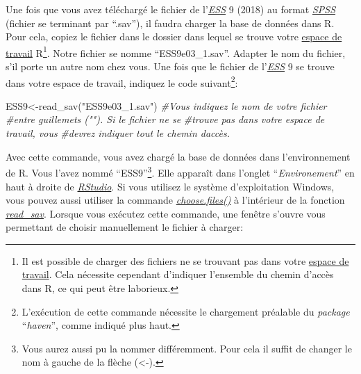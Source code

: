 \documentclass[
]{book}
\newenvironment{Shaded}{\begin{snugshade}}{\end{snugshade}}
\newcommand{\CommentTok}[1]{\textcolor[rgb]{0.56,0.35,0.01}{\textit{#1}}}
\newcommand{\FunctionTok}[1]{\textcolor[rgb]{0.00,0.00,0.00}{#1}}
\newcommand{\NormalTok}[1]{#1}
\newcommand{\OtherTok}[1]{\textcolor[rgb]{0.56,0.35,0.01}{#1}}
\newcommand{\StringTok}[1]{\textcolor[rgb]{0.31,0.60,0.02}{#1}}
\begin{document}
Une fois que vous avez téléchargé le fichier de l'\href{https://www.europeansocialsurvey.org/}{\emph{ESS}} 9 (2018) au format \href{https://www.ibm.com/fr-fr/products/spss-statistics}{\emph{SPSS}} (fichier se terminant par ``.sav''), il faudra charger la base de données dans R. Pour cela, copiez le fichier dans le dossier dans lequel se trouve votre \protect\hyperlink{working_directory}{espace de travail} R\footnote{Il est possible de charger des fichiers ne se trouvant pas dans votre \protect\hyperlink{working_directory}{espace de travail}. Cela nécessite cependant d'indiquer l'ensemble du chemin d'accès dans R, ce qui peut être laborieux.}. Notre fichier se nomme ``ESS9e03\_1.sav''. Adapter le nom du fichier, s'il porte un autre nom chez vous. Une fois que le fichier de l'\href{https://www.europeansocialsurvey.org/}{\emph{ESS}} 9 se trouve dans votre espace de travail, indiquez le code suivant\footnote{L'exécution de cette commande nécessite le chargement préalable du \emph{package} ``\emph{haven}'', comme indiqué plus haut.}:

\begin{Shaded}
\begin{Highlighting}[]
\NormalTok{ESS9}\OtherTok{\textless{}{-}}\FunctionTok{read\_sav}\NormalTok{(}\StringTok{"ESS9e03\_1.sav"}\NormalTok{) }\CommentTok{\#Vous indiquez le nom de votre fichier}
                      \CommentTok{\#entre guillemets (""). Si le fichier ne se}
                      \CommentTok{\#trouve pas dans votre espace de travail, vous}
                      \CommentTok{\#devrez indiquer tout le chemin d\textquotesingle{}accès.}
\end{Highlighting}
\end{Shaded}

Avec cette commande, vous avez chargé la base de données dans l'environnement de R. Vous l'avez nommé ``ESS9''\footnote{Vous aurez aussi pu la nommer différemment. Pour cela il suffit de changer le nom à gauche de la flèche (\textless-).}. Elle apparaît dans l'onglet ``\emph{Environement}'' en haut à droite de \href{https://posit.co/}{\emph{RStudio}}. Si vous utilisez le système d'exploitation Windows, vous pouvez aussi utiliser la commande \href{https://www.rdocumentation.org/packages/utils/versions/3.6.2/topics/choose.files}{\emph{choose.files()}} à l'intérieur de la fonction \href{https://haven.tidyverse.org/reference/read_spss.html}{\emph{read\_sav}}. Lorsque vous exécutez cette commande, une fenêtre s'ouvre vous permettant de choisir manuellement le fichier à charger:
\end{document}
